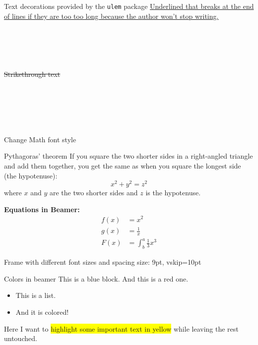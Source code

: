 \documentclass{beamer}
\begin{document}
\begin{frame}{Text decorations provided by the
    \texttt{ulem} package}
  \uline{Underlined that breaks at the end of lines if
    they are too too long because the author won’t stop
    writing.} \\~\\
   \\~\\
   \\~\\
  \sout{Strikethrough text} \\~\\
   \\~\\
   \\~\\ 
\end{frame}

\begin{frame}{Change Math font style}
  \begin{block}{Pythagoras' theorem}
    If you square the two shorter sides in a right-angled triangle and add them together, you get the same as when you square the longest side (the hypotenuse):
    \[ x^2 + y^2 = z^2 \]
    where $x$ and $y$ are the two shorter sides and $z$ is the hypotenuse.
  \end{block}
  \textbf{Equations in Beamer: }
  \begin{align*}
    f(x) &= x^2\\
    g(x) &= \frac{1}{x}\\
    F(x) &= \int^a_b \frac{1}{3}x^3
  \end{align*}
\end{frame}

\begin{frame}{Frame with different font sizes and spacing }{size: 9pt, vskip=10pt}
  \fontsize{9pt}{10pt}\selectfont
  \lipsum[2]
\end{frame}

\begin{frame}{Colors in beamer}
  {\color{blue} This is a blue block.}
  {\color{red} And this is a red one.}
  \begin{itemize}
    \color{green}
  \item This is a list.
  \item And it is colored!
  \end{itemize}

  Here I want to \colorbox{yellow}{highlight some important text in yellow}
  while leaving the rest untouched.
\end{frame}
\end{document}
